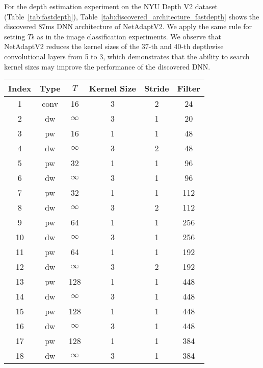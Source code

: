 For the depth estimation experiment on the NYU Depth V2 dataset (Table~\ref{tab:fastdepth}), Table~\ref{tab:discovered_architecture_fastdepth} shows the discovered 87ms DNN architecture of NetAdaptV2. We apply the same rule for setting $T$s as in the image classification experiments. We observe that NetAdaptV2 reduces the kernel sizes of the $37$-th and $40$-th depthwise convolutional layers from 5 to 3, which demonstrates that the ability to search kernel sizes may improve the performance of the discovered DNN.


\begin{table*}[t]
\centering
\begin{tabular}{c|c|c|c|c|c}
\toprule
Index & Type     & $T$   & Kernel Size & Stride & Filter  \\ \toprule
1     & conv     & 16  & 3           & 2      & 24  \\ \hline
2     & dw       & $\infty$ & 3           & 1      & 20  \\ \hline
3     & pw       & 16  & 1           & 1      & 48  \\ \hline
4     & dw       & $\infty$ & 3           & 2      & 48  \\ \hline
5     & pw       & 32  & 1           & 1      & 96  \\ \hline
6     & dw       & $\infty$ & 3           & 1      & 96  \\ \hline
7     & pw       & 32  & 1           & 1      & 112 \\ \hline
8     & dw       & $\infty$ & 3           & 2      & 112 \\ \hline
9     & pw       & 64  & 1           & 1      & 256 \\ \hline
10    & dw       & $\infty$ & 3           & 1      & 256 \\ \hline
11    & pw       & 64  & 1           & 1      & 192 \\ \hline
12    & dw       & $\infty$ & 3           & 2      & 192 \\ \hline
13    & pw       & 128 & 1           & 1      & 448 \\ \hline
14    & dw       & $\infty$ & 3           & 1      & 448 \\ \hline
15    & pw       & 128 & 1           & 1      & 448 \\ \hline
16    & dw       & $\infty$ & 3           & 1      & 448 \\ \hline
17    & pw       & 128 & 1           & 1      & 384 \\ \hline
18    & dw       & $\infty$ & 3           & 1      & 384 \\ \hline

\end{tabular}
\end{table*}
